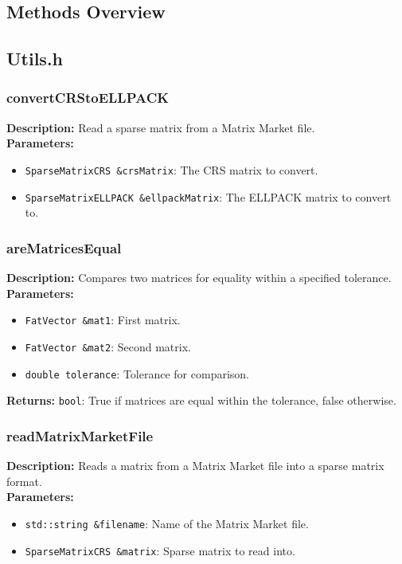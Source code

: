 \documentclass[12pt,oneside]{book} %
\begin{document}
\begin{subappendices}
    \section{Methods Overview}
    \subsection{Utils.h}
    \subsubsection{convertCRStoELLPACK}
    \textbf{Description:} Read a sparse matrix from a Matrix Market file.\\

    \textbf{Parameters:}
    \begin{itemize}
        \item \texttt{SparseMatrixCRS \&crsMatrix}: The CRS matrix to convert.
        \item \texttt{SparseMatrixELLPACK \&ellpackMatrix}: The ELLPACK matrix to convert to.
    \end{itemize}

    \subsubsection{areMatricesEqual}
    \textbf{Description:} Compares two matrices for equality within a specified tolerance.\\

    \textbf{Parameters:}
    \begin{itemize}
        \item \texttt{FatVector \&mat1}: First matrix.
        \item \texttt{FatVector \&mat2}: Second matrix.
        \item \texttt{double tolerance}: Tolerance for comparison.
    \end{itemize}

    \textbf{Returns:} \texttt{bool}: True if matrices are equal within the tolerance, false otherwise.

    \subsubsection{readMatrixMarketFile}
    \textbf{Description:} Reads a matrix from a Matrix Market file into a sparse matrix format.\\

    \textbf{Parameters:}
    \begin{itemize}
        \item \texttt{std::string \&filename}: Name of the Matrix Market file.
        \item \texttt{SparseMatrixCRS \&matrix}: Sparse matrix to read into.
    \end{itemize}


\end{subappendices}
\end{document}
